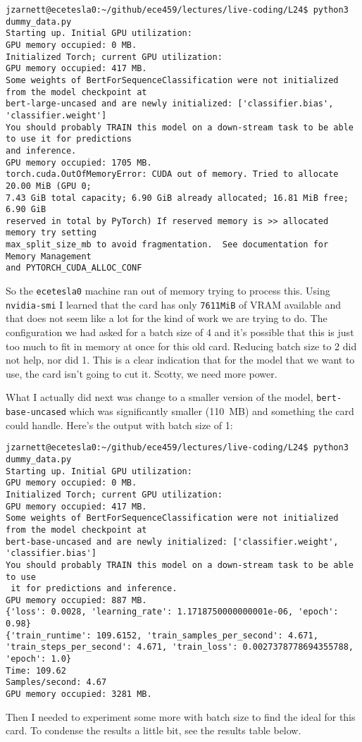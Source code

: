 {\small
\begin{verbatim}
jzarnett@ecetesla0:~/github/ece459/lectures/live-coding/L24$ python3 dummy_data.py 
Starting up. Initial GPU utilization:
GPU memory occupied: 0 MB.
Initialized Torch; current GPU utilization:
GPU memory occupied: 417 MB.
Some weights of BertForSequenceClassification were not initialized from the model checkpoint at 
bert-large-uncased and are newly initialized: ['classifier.bias', 'classifier.weight']
You should probably TRAIN this model on a down-stream task to be able to use it for predictions 
and inference.
GPU memory occupied: 1705 MB.
torch.cuda.OutOfMemoryError: CUDA out of memory. Tried to allocate 20.00 MiB (GPU 0; 
7.43 GiB total capacity; 6.90 GiB already allocated; 16.81 MiB free; 6.90 GiB 
reserved in total by PyTorch) If reserved memory is >> allocated memory try setting 
max_split_size_mb to avoid fragmentation.  See documentation for Memory Management
and PYTORCH_CUDA_ALLOC_CONF
\end{verbatim}
}

So the \texttt{ecetesla0} machine ran out of memory trying to process this. Using \texttt{nvidia-smi} I learned that the card has only \texttt{7611MiB} of VRAM available and that does not seem like a lot for the kind of work we are trying to do. The configuration we had asked for a batch size of 4 and it's possible that this is just too much to fit in memory at once for this old card. Reducing batch size to 2 did not help, nor did 1. This is a clear indication that for the model that we want to use, the card isn't going to cut it. Scotty, we need more power.

What I actually did next was change to a smaller version of the model, \texttt{bert-base-uncased} which was significantly smaller (110~MB) and something the card could handle. Here's the output with batch size of 1:

{\small
\begin{verbatim}
jzarnett@ecetesla0:~/github/ece459/lectures/live-coding/L24$ python3 dummy_data.py 
Starting up. Initial GPU utilization:
GPU memory occupied: 0 MB.
Initialized Torch; current GPU utilization:
GPU memory occupied: 417 MB.
Some weights of BertForSequenceClassification were not initialized from the model checkpoint at 
bert-base-uncased and are newly initialized: ['classifier.weight', 'classifier.bias']
You should probably TRAIN this model on a down-stream task to be able to use
 it for predictions and inference.
GPU memory occupied: 887 MB.
{'loss': 0.0028, 'learning_rate': 1.1718750000000001e-06, 'epoch': 0.98}
{'train_runtime': 109.6152, 'train_samples_per_second': 4.671, 
'train_steps_per_second': 4.671, 'train_loss': 0.0027378778694355788, 'epoch': 1.0}
Time: 109.62
Samples/second: 4.67
GPU memory occupied: 3281 MB.
\end{verbatim}
}
Then I needed to experiment some more with batch size to find the ideal for this card. To condense the results a little bit, see the results table below.


